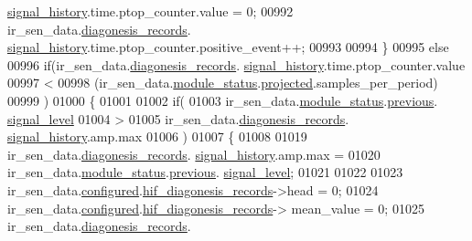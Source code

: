 \begin{DoxyCode}
{{      \hyperlink{a00017_affb63906d23cb1cb7787d61eaaedfb60}{signal\_history}.time.ptop\_counter.value = 0;
00992                        ir\_sen\_data.\hyperlink{a00023_a7ae905b560513ad201e58c2f63375030}{diagonesis\_records}.
      \hyperlink{a00017_affb63906d23cb1cb7787d61eaaedfb60}{signal\_history}.time.ptop\_counter.positive\_event++;
00993 
00994                    \}
00995                    \textcolor{keywordflow}{else}
00996                    \textcolor{keywordflow}{if}(ir\_sen\_data.\hyperlink{a00023_a7ae905b560513ad201e58c2f63375030}{diagonesis\_records}.
      \hyperlink{a00017_affb63906d23cb1cb7787d61eaaedfb60}{signal\_history}.time.ptop\_counter.value
00997                            <
00998                       (ir\_sen\_data.\hyperlink{a00023_a5a53c391562b059eb744ac679f3765ca}{module\_status}.\hyperlink{a00017_a6b2516d74583418cec324c50041421c9}{projected}.samples\_per\_period)
00999                    )
01000                    \{
01001 
01002                     \textcolor{keywordflow}{if}(
01003                      ir\_sen\_data.\hyperlink{a00023_a5a53c391562b059eb744ac679f3765ca}{module\_status}.\hyperlink{a00017_a0fc6d9ce6203a17f672c19d3d8747aee}{previous}.
      \hyperlink{a00017_abcdf2bc0c2e5a14863938ae28c3bc96e}{signal\_level}
01004                       >
01005                      ir\_sen\_data.\hyperlink{a00023_a7ae905b560513ad201e58c2f63375030}{diagonesis\_records}.
      \hyperlink{a00017_affb63906d23cb1cb7787d61eaaedfb60}{signal\_history}.amp.max
01006                      )
01007                    \{
01008 
01019                        ir\_sen\_data.\hyperlink{a00023_a7ae905b560513ad201e58c2f63375030}{diagonesis\_records}.
      \hyperlink{a00017_affb63906d23cb1cb7787d61eaaedfb60}{signal\_history}.amp.max =
01020                        ir\_sen\_data.\hyperlink{a00023_a5a53c391562b059eb744ac679f3765ca}{module\_status}.\hyperlink{a00017_a0fc6d9ce6203a17f672c19d3d8747aee}{previous}.
      \hyperlink{a00017_abcdf2bc0c2e5a14863938ae28c3bc96e}{signal\_level};
01021            
01022 
01023                        ir\_sen\_data.\hyperlink{a00023_a94b2d1f6ea4ab334c74d24984dd27843}{configured}.\hyperlink{a00021_ae18294f7499d9fcb5ec796a1816b8cd8}{hif\_diagonesis\_records}->head 
                                     = 0;
01024                        ir\_sen\_data.\hyperlink{a00023_a94b2d1f6ea4ab334c74d24984dd27843}{configured}.\hyperlink{a00021_ae18294f7499d9fcb5ec796a1816b8cd8}{hif\_diagonesis\_records}->
      mean\_value                          = 0;
01025                        ir\_sen\_data.\hyperlink{a00023_a7ae905b560513ad201e58c2f63375030}{diagonesis\_records}.
}}
\end{DoxyCode}
